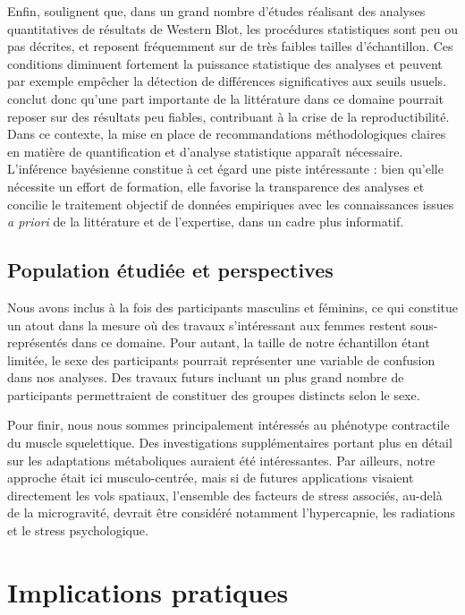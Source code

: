 \documentclass[11pt]{report}
\begin{document}
Enfin, \textcite{Gosselin2022} soulignent que, dans un grand nombre d'études réalisant des analyses quantitatives de résultats de Western Blot, les procédures statistiques sont peu ou pas décrites, et reposent fréquemment sur de très faibles tailles d'échantillon. Ces conditions diminuent fortement la puissance statistique des analyses et peuvent par exemple empêcher la détection de différences significatives aux seuils usuels. \textcite{Gosselin2022} conclut donc qu'une part importante de la littérature dans ce domaine pourrait reposer sur des résultats peu fiables, contribuant à la crise de la reproductibilité. Dans ce contexte, la mise en place de recommandations méthodologiques claires en matière de quantification et d'analyse statistique apparaît nécessaire. L'inférence bayésienne constitue à cet égard une piste intéressante : bien qu'elle nécessite un effort de formation, elle favorise la transparence des analyses et concilie le traitement objectif de données empiriques avec les connaissances issues \textit{a priori} de la littérature et de l'expertise, dans un cadre plus informatif.

\subsection{Population étudiée et perspectives}

Nous avons inclus à la fois des participants masculins et féminins, ce qui constitue un atout dans la mesure où des travaux s'intéressant aux femmes restent sous-représentés dans ce domaine. Pour autant, la taille de notre échantillon étant limitée, le sexe des participants pourrait représenter une variable de confusion dans nos analyses. Des travaux futurs incluant un plus grand nombre de participants permettraient de constituer des groupes distincts selon le sexe.

Pour finir, nous nous sommes principalement intéressés au phénotype contractile du muscle squelettique. Des investigations supplémentaires portant plus en détail sur les adaptations métaboliques auraient été intéressantes. Par ailleurs, notre approche était ici musculo-centrée, mais si de futures applications visaient directement les vols spatiaux, l'ensemble des facteurs de stress associés, au-delà de la microgravité, devrait être considéré notamment l'hypercapnie, les radiations et le stress psychologique.

\section{Implications pratiques}
\end{document}
